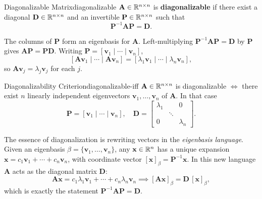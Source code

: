 \begin{definition}{Diagonalizable Matrix}{diagonalizable}
  $\mathbf{A} \in \mathbb{R}^{n \times n}$ is \textbf{diagonalizable} if there exist a diagonal $\mathbf{D} \in \mathbb{R}^{n \times n}$ and an invertible $\mathbf{P} \in \mathbb{R}^{n \times n}$ such that
  \[
    \mathbf{P}^{-1} \mathbf{A} \mathbf{P} = \mathbf{D}.
  \]
\end{definition}

\begin{remark}
  The columns of $\mathbf{P}$ form an eigenbasis for $\mathbf{A}$. Left-multiplying $\mathbf{P}^{-1}\mathbf{A}\mathbf{P} = \mathbf{D}$ by $\mathbf{P}$ gives $\mathbf{A}\mathbf{P} = \mathbf{P}\mathbf{D}$. Writing $\mathbf{P} = [\mathbf{v}_1 \mid \cdots \mid \mathbf{v}_n]$,
  \[
    [\mathbf{A}\mathbf{v}_1 \mid \cdots \mid \mathbf{A}\mathbf{v}_n]
    = [\lambda_1 \mathbf{v}_1 \mid \cdots \mid \lambda_n \mathbf{v}_n],
  \]
  so $\mathbf{A}\mathbf{v}_j = \lambda_j \mathbf{v}_j$ for each $j$.
\end{remark}

\begin{theorem}{Diagonalizability Criterion}{diagonalizable-iff}
  $\mathbf{A} \in \mathbb{R}^{n \times n}$ is diagonalizable $\iff$ there exist $n$ linearly independent eigenvectors $\mathbf{v}_1, \ldots, \mathbf{v}_n$ of $\mathbf{A}$. In that case
  \[
    \mathbf{P} = [\mathbf{v}_1 \mid \cdots \mid \mathbf{v}_n],
    \quad
    \mathbf{D} =
    \begin{bmatrix}
      \lambda_1 &        & 0         \\
                & \ddots &           \\
      0         &        & \lambda_n
    \end{bmatrix}
    .
  \]
\end{theorem}

\begin{remark}
  The essence of diagonalization is rewriting vectors in the \emph{eigenbasis language}. Given an eigenbasis $\beta = \{\mathbf{v}_1, \ldots, \mathbf{v}_n\}$, any $\mathbf{x} \in \mathbb{R}^n$ has a unique expansion $\mathbf{x} = c_1 \mathbf{v}_1 + \cdots + c_n \mathbf{v}_n$, with coordinate vector $[\mathbf{x}]_\beta = \mathbf{P}^{-1}\mathbf{x}$. In this new language $\mathbf{A}$ acts as the diagonal matrix $\mathbf{D}$:
  \[
    \mathbf{A}\mathbf{x} = c_1 \lambda_1 \mathbf{v}_1 + \cdots + c_n \lambda_n \mathbf{v}_n
    \implies [\mathbf{A}\mathbf{x}]_\beta = \mathbf{D}\,[\mathbf{x}]_\beta,
  \]
  which is exactly the statement $\mathbf{P}^{-1}\mathbf{A}\mathbf{P} = \mathbf{D}$.
\end{remark}

